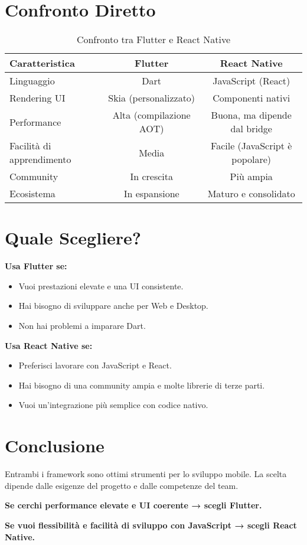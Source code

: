 \documentclass[a4paper,12pt]{article}
\begin{document}
\section{Confronto Diretto}
\begin{table}[h]
    \centering
    \begin{tabular}{lcc}
        \toprule
        \textbf{Caratteristica} & \textbf{Flutter} & \textbf{React Native} \\
        \midrule
        Linguaggio & Dart & JavaScript (React) \\
        Rendering UI & Skia (personalizzato) & Componenti nativi \\
        Performance & Alta (compilazione AOT) & Buona, ma dipende dal bridge \\
        Facilità di apprendimento & Media & Facile (JavaScript è popolare) \\
        Community & In crescita & Più ampia \\
        Ecosistema & In espansione & Maturo e consolidato \\
        \bottomrule
    \end{tabular}
    \caption{Confronto tra Flutter e React Native}
\end{table}

\section{Quale Scegliere?}
\textbf{Usa Flutter se:}
\begin{itemize}
    \item Vuoi prestazioni elevate e una UI consistente.
    \item Hai bisogno di sviluppare anche per Web e Desktop.
    \item Non hai problemi a imparare Dart.
\end{itemize}

\textbf{Usa React Native se:}
\begin{itemize}
    \item Preferisci lavorare con JavaScript e React.
    \item Hai bisogno di una community ampia e molte librerie di terze parti.
    \item Vuoi un’integrazione più semplice con codice nativo.
\end{itemize}

\section{Conclusione}
Entrambi i framework sono ottimi strumenti per lo sviluppo mobile. La scelta dipende dalle esigenze del progetto e dalle competenze del team. 

\textbf{Se cerchi performance elevate e UI coerente → scegli Flutter.}

\textbf{Se vuoi flessibilità e facilità di sviluppo con JavaScript → scegli React Native.}
\end{document}
